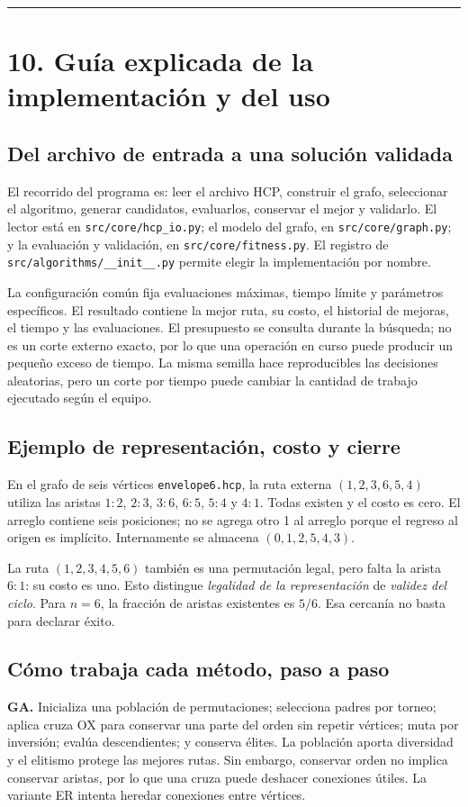 \documentclass[
  spanish,
  12pt,
]{article}
\begin{document}
\begin{center}\rule{0.5\linewidth}{0.5pt}\end{center}


\clearpage
\section{10. Guía explicada de la implementación y del uso}
\subsection{Del archivo de entrada a una solución validada}
El recorrido del programa es: leer el archivo HCP, construir el grafo, seleccionar el algoritmo, generar candidatos, evaluarlos, conservar el mejor y validarlo. El lector está en \texttt{src/core/hcp\_io.py}; el modelo del grafo, en \texttt{src/core/graph.py}; y la evaluación y validación, en \texttt{src/core/fitness.py}. El registro de \texttt{src/algorithms/\_\_init\_\_.py} permite elegir la implementación por nombre.

La configuración común fija evaluaciones máximas, tiempo límite y parámetros específicos. El resultado contiene la mejor ruta, su costo, el historial de mejoras, el tiempo y las evaluaciones. El presupuesto se consulta durante la búsqueda; no es un corte externo exacto, por lo que una operación en curso puede producir un pequeño exceso de tiempo. La misma semilla hace reproducibles las decisiones aleatorias, pero un corte por tiempo puede cambiar la cantidad de trabajo ejecutado según el equipo.

\subsection{Ejemplo de representación, costo y cierre}
En el grafo de seis vértices \texttt{envelope6.hcp}, la ruta externa $(1,2,3,6,5,4)$ utiliza las aristas $1\!:\!2$, $2\!:\!3$, $3\!:\!6$, $6\!:\!5$, $5\!:\!4$ y $4\!:\!1$. Todas existen y el costo es cero. El arreglo contiene seis posiciones; no se agrega otro 1 al arreglo porque el regreso al origen es implícito. Internamente se almacena $(0,1,2,5,4,3)$.

La ruta $(1,2,3,4,5,6)$ también es una permutación legal, pero falta la arista $6\!:\!1$: su costo es uno. Esto distingue \emph{legalidad de la representación} de \emph{validez del ciclo}. Para $n=6$, la fracción de aristas existentes es $5/6$. Esa cercanía no basta para declarar éxito.

\subsection{Cómo trabaja cada método, paso a paso}
\textbf{GA.} Inicializa una población de permutaciones; selecciona padres por torneo; aplica cruza OX para conservar una parte del orden sin repetir vértices; muta por inversión; evalúa descendientes; y conserva élites. La población aporta diversidad y el elitismo protege las mejores rutas. Sin embargo, conservar orden no implica conservar aristas, por lo que una cruza puede deshacer conexiones útiles. La variante ER intenta heredar conexiones entre vértices.
\end{document}
